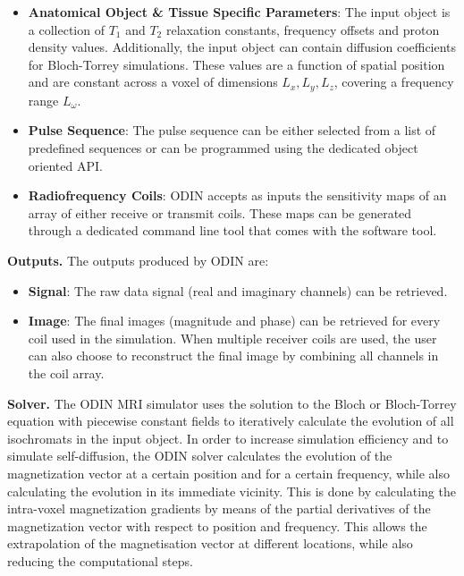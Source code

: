 \begin{itemize}
    
    \item \textbf{Anatomical Object \& Tissue Specific Parameters}: 
    The input object is a collection of $T_1$ and $T_2$ relaxation constants, frequency offsets and proton density values.
    Additionally, the input object can contain diffusion coefficients for Bloch-Torrey simulations.
    These values are a function of spatial position and are constant across a voxel of dimensions $L_x, L_y, L_z$, covering a frequency range $L_{\omega}$.
    
    \item \textbf{Pulse Sequence}: The pulse sequence can be either selected from a list of predefined sequences or can be programmed using the dedicated object oriented API.
    
    \item \textbf{Radiofrequency Coils}: ODIN accepts as inputs the sensitivity maps of an array of either receive or transmit coils.
    These maps can be generated through a dedicated command line tool that comes with the software tool.
    
\end{itemize}


\hfill

\textbf{Outputs.} The outputs produced by ODIN are:
\begin{itemize}
    
    \item \textbf{Signal}: The raw data signal (real and imaginary channels) can be retrieved.
    
    \item \textbf{Image}: The final images  (magnitude  and phase) can be retrieved for every coil used in the simulation.
    When multiple receiver coils are used, the user can also choose to reconstruct the final image by combining all channels in the coil array.
    
\end{itemize}

\hfill

\textbf{Solver.} The ODIN MRI simulator uses the solution 
to the Bloch or Bloch-Torrey equation with piecewise constant fields to iteratively calculate the evolution of all isochromats in the input object.
In order to increase simulation efficiency and to simulate self-diffusion, the ODIN solver calculates the evolution of the magnetization vector at a certain position and for a certain frequency, while also calculating the evolution in its immediate vicinity.
This is done by calculating the intra-voxel magnetization gradients by means of the partial derivatives of the magnetization vector with respect to position and frequency.
This allows the extrapolation of the magnetisation vector at different locations, while also reducing the computational steps.

